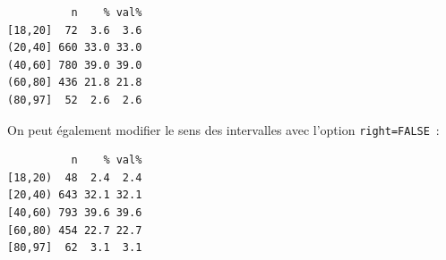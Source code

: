 \documentclass[
  letterpaper,
  DIV=11,
  numbers=noendperiod,
  oneside]{scrreprt}
\newenvironment{Shaded}{\begin{snugshade}}{\end{snugshade}}
\newcommand{\AttributeTok}[1]{\textcolor[rgb]{0.40,0.45,0.13}{#1}}
\newcommand{\ConstantTok}[1]{\textcolor[rgb]{0.56,0.35,0.01}{#1}}
\newcommand{\DecValTok}[1]{\textcolor[rgb]{0.68,0.00,0.00}{#1}}
\newcommand{\FunctionTok}[1]{\textcolor[rgb]{0.28,0.35,0.67}{#1}}
\newcommand{\NormalTok}[1]{\textcolor[rgb]{0.00,0.23,0.31}{#1}}
\newcommand{\OtherTok}[1]{\textcolor[rgb]{0.00,0.23,0.31}{#1}}
\newcommand{\SpecialCharTok}[1]{\textcolor[rgb]{0.37,0.37,0.37}{#1}}
\begin{document}
\begin{verbatim}
          n    % val%
[18,20]  72  3.6  3.6
(20,40] 660 33.0 33.0
(40,60] 780 39.0 39.0
(60,80] 436 21.8 21.8
(80,97]  52  2.6  2.6
\end{verbatim}

On peut également modifier le sens des intervalles avec l'option
\texttt{right=FALSE}~:

\begin{Shaded}
\end{Shaded}

\begin{verbatim}
          n    % val%
[18,20)  48  2.4  2.4
[20,40) 643 32.1 32.1
[40,60) 793 39.6 39.6
[60,80) 454 22.7 22.7
[80,97]  62  3.1  3.1
\end{verbatim}
\end{document}
